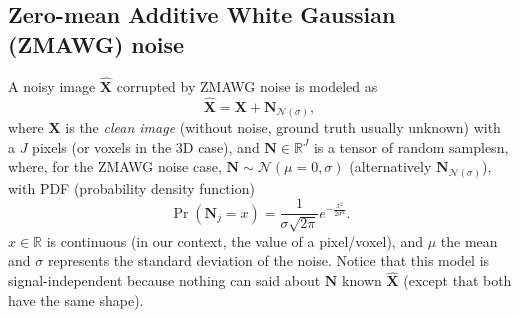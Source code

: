 \documentclass{article}
\begin{document}

\subsection{Zero-mean Additive White Gaussian (ZMAWG) noise}
A noisy image $\hat{\mathbf X}$ corrupted by ZMAWG noise is modeled as
\begin{equation}
  \hat{\mathbf X} = {\mathbf X} + {\mathbf N}_{{\mathcal N}(\sigma)},
  \label{eq:AWG_noise_model}  
\end{equation}
where $\mathbf{X}$ is the \emph{clean image} (without noise, ground
truth usually unknown) with a $J$ pixels (or voxels in the 3D case),
and ${\mathbf N}\in\mathbb{R}^J$ is a tensor of random samplesn,
where, for the ZMAWG noise case,
${\mathbf N}\sim{\mathcal N}(\mu=0,\sigma)$ (alternatively
${\mathbf N}_{{\mathcal N}(\sigma)}$), with PDF (probability density
function)
\begin{equation}
  \Pr({\mathbf N}_j{=}x) = \frac 1 {\sigma\sqrt{2\pi}} e^{-\frac{x^2}{2\sigma^2} }.
\end{equation}
$x\in\mathbb{R}$ is continuous (in our context, the value of a
pixel/voxel), and $\mu$ the mean and $\sigma$ represents the standard
deviation of the noise. Notice that this model is signal-independent
because nothing can said about ${\mathbf N}$ known $\hat{\mathbf X}$
(except that both have the same shape).
\end{document}
